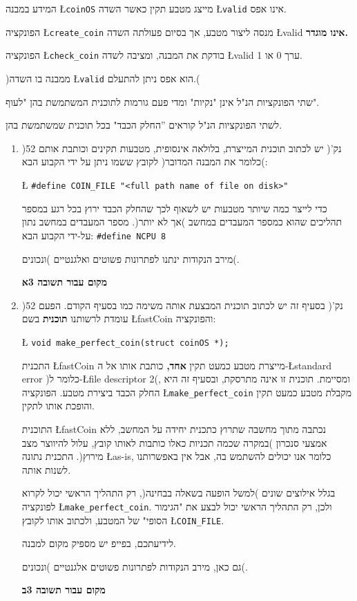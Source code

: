 \documentclass[12pt]{article}
\begin{document}
\begin{enumerate}
המידע במבנה
\L{\lstinline$coinOS$}
מייצג מטבע תקין כאשר השדה
\L{\lstinline$valid$}
אינו אפס.

הפונקציה
 \L{\lstinline$create_coin$}
 מנסה ליצור מטבע, אך בסיום פעולתה  השדה
  \L{valid}
  {\bf
   אינו מוגדר.
  }
  
הפונקציה
 \L{\lstinline$check_coin$}
  בודקת את המבנה, ומציבה לשדה
  \L{valid}
   ערך 0 או 1.
   
   )ממבנה בו השדה 
   \L{\lstinline$valid$}
   הוא אפס ניתן להתעלם.(
   
   שתי הפונקציות הנ"ל אינן "נקיות" ומדי פעם גורמות לתוכנית המשתמשת בהן "לעוף".

לשתי הפונקציות הנ"ל קוראים ''החלק הכבד" בכל תוכנית שמשתמשת בהן.

%
\begin{enumerate}
\item
)52 נק'(
יש לכתוב תוכנית המייצרת, בלולאה אינסופית,
			 מטבעות תקינים וכותבת אותם )כלומר את המבנה המדובר( לקובץ ששמו ניתן על ידי הקבוע הבא:

\hfill\L{
\lstinline$#define COIN_FILE "<full path name of file on disk>"$
}

כדי לייצר כמה שיותר מטבעות  יש לשאוף לכך שהחלק הכבד ירוץ בכל רגע במספר תהליכים שהוא כמספר המעבדים  במחשב
)אך לא יותר(.
מספר המעבדים במחשב נתון על-ידי הקבוע הבא: 
\unsethebrew
\lstinline$#define NCPU 8$
\sethebrew


מירב הנקודות ינתנו לפתרונות פשוטים ואלגנטיים )ונכונים(.  
\newpage
\begin{center}
{\bf\large
מקום עבור תשובה 3א
}
\end{center}
\newpage
%
\item
)52 נק'(
בסעיף זה יש לכתוב תוכנית המבצעת אותה משימה כמו בסעיף הקודם.
הפעם עומדת לרשותנו
{\bf
תוכנית
}
בשם
 \L{fastCoin}
  והפונקציה:
  
\hfill\L{
\lstinline$void make_perfect_coin(struct coinOS *);$
}

התכנית
\L{fastCoin}
 מייצרת מטבע כמעט תקין 
 {\bf
אחד,
}
כותבת אותו אל ה-\L{standard error} )כלומר ל-\L{file descriptor} 2(,
ומסיימת.
תוכנית זו אינה מתרסקת, ובסעיף זה היא החלק הכבד ביצירת מטבע.
הפונקציה 
\L{\lstinline$make_perfect_coin$}
מקבלת מטבע כמעט תקין והופכת אותו לתקין.
 
 התוכנית
\L{fastCoin}
נכתבה מתוך מחשבה שתרוץ כתכנית יחידה על המחשב,
 	 ללא אמצעי סנכרון )במקרה שכמה תכניות כאלו כותבות לאותו קובץ, עלול להיווצר מצב מירוץ(.
    התכנית נתונה
    \L{as-is},
      כלומר אנו יכולים להשתמש בה, אבל אין באפשרותנו לשנות אותה.

 בגלל אילוצים שונים )למשל הופעה בשאלה בבחינה(, רק התהליך הראשי יכול לקרוא לפונקציה  
 \L{\lstinline$make_perfect_coin$}.
  ולכן, רק התהליך הראשי יכול לבצע את "הגימור הסופי" של המטבע, ולכתוב אותו לקובץ 
  \L{\lstinline$COIN_FILE$}.
  
  לידיעתכם, בפייפ יש מספיק מקום למבנה.

גם כאן, מירב הנקודות לפתרונות פשוטים אלגנטיים )ונכונים(.
\newpage
\begin{center}
{\bf\large
מקום עבור תשובה 3ב
}
\end{center}
\newpage

\end{enumerate}

\end{enumerate}
\end{document}
